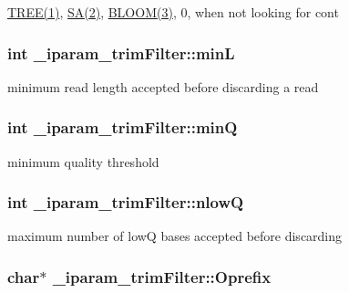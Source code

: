 \hyperlink{defines_8h_abf5b8fbbeb8255336e401a15a80214a8}{T\+R\+E\+E(1)}, \hyperlink{defines_8h_a1e43924adac4ae865aa0acf79710261c}{S\+A(2)}, \hyperlink{defines_8h_a7dcb6cfd9e186d997dce1d6cabe58898}{B\+L\+O\+O\+M(3)}, 0, when not looking for cont \hypertarget{struct__iparam__trimFilter_ac2b43664ca0c95a8572f97254893d675}{
\subsubsection[{min\+L}]{\setlength{\rightskip}{0pt plus 5cm}int \+\_\+iparam\+\_\+trim\+Filter\+::min\+L}}\label{struct__iparam__trimFilter_ac2b43664ca0c95a8572f97254893d675}
minimum read length accepted before discarding a read \hypertarget{struct__iparam__trimFilter_a1e2b69f148d9299815af6ab7f575ad1a}{
\subsubsection[{min\+Q}]{\setlength{\rightskip}{0pt plus 5cm}int \+\_\+iparam\+\_\+trim\+Filter\+::min\+Q}}\label{struct__iparam__trimFilter_a1e2b69f148d9299815af6ab7f575ad1a}
minimum quality threshold \hypertarget{struct__iparam__trimFilter_aaeab85398303eada76cb6f32841fa094}{
\subsubsection[{nlow\+Q}]{\setlength{\rightskip}{0pt plus 5cm}int \+\_\+iparam\+\_\+trim\+Filter\+::nlow\+Q}}\label{struct__iparam__trimFilter_aaeab85398303eada76cb6f32841fa094}
maximum number of low\+Q bases accepted before discarding \hypertarget{struct__iparam__trimFilter_ad24f2902b532a4ff2dfb1122941064b8}{
\subsubsection[{Oprefix}]{\setlength{\rightskip}{0pt plus 5cm}char$\ast$ \+\_\+iparam\+\_\+trim\+Filter\+::\+Oprefix}}\label{struct__iparam__trimFilter_ad24f2902b532a4ff2dfb1122941064b8}
